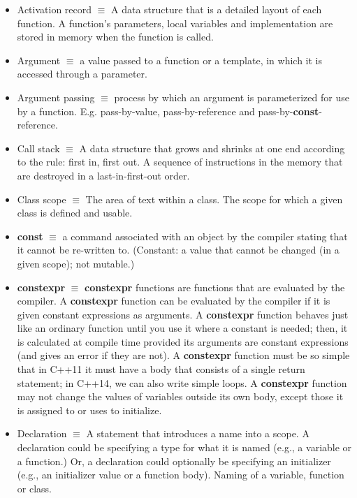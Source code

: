 \documentclass[12pt]{article}
\begin{document}
\begin{itemize}
\item Activation record $\equiv$ A data structure that is a detailed layout of each function. A function's parameters, local variables and implementation are stored in memory when the function is called.

\item Argument $\equiv$ a value passed to a function or a template, in which it is accessed through a parameter.

\item Argument passing $\equiv$ process by which an argument is parameterized for use by a function. E.g. pass-by-value, pass-by-reference and pass-by-\textbf{const}-reference.

\item Call stack $\equiv$ A data structure that grows and shrinks at one end according to the rule: first in, first out. A sequence of instructions in the memory that are destroyed in a last-in-first-out order.

\item Class scope $\equiv$ The area of text within a class. The scope for which a given class is defined and usable.

\item \textbf{const} $\equiv$ a command associated with an object by the compiler stating that it cannot be re-written to. (Constant: a value that cannot be changed (in a given scope); not mutable.)

\item \textbf{constexpr} $\equiv$ \textbf{constexpr} functions are functions that are evaluated by the compiler. A \textbf{constexpr} function can be evaluated by the compiler if it is given constant expressions as arguments. A \textbf{constexpr} function behaves just like an ordinary function until you use it where a constant is needed; then, it is calculated at compile time provided its arguments are constant expressions (and gives an error if they are not). A \textbf{constexpr} function must be so simple that in C++11 it must have a body that consists of a single return statement; in C++14, we can also write simple loops. A \textbf{constexpr} function may not change the values of variables outside its own body, except those it is assigned to or uses to initialize.

\item Declaration $\equiv$ A statement that introduces a name into a scope. A declaration could be specifying a type for what it is named (e.g., a variable or a function.) Or, a declaration could optionally be specifying an initializer (e.g., an initializer value or a function body). Naming of a variable, function or class.


\end{itemize}
\end{document}
